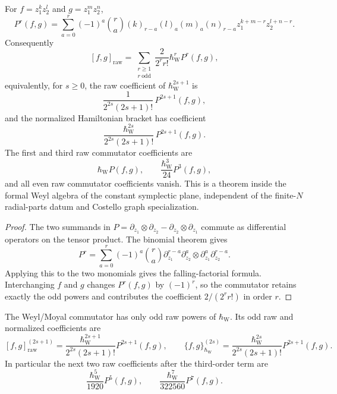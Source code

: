 \begin{thm}
\label{thm:app-radial-moyal-coefficients}
  For \(f=z_1^kz_2^l\) and \(g=z_1^mz_2^n\),
  \[
    P^r(f,g)=
    \sum_{a=0}^r(-1)^a\binom ra
      (k)_{r-a}(l)_a(m)_a(n)_{r-a}
      z_1^{k+m-r}z_2^{l+n-r}.
  \]
  Consequently
  \[
    [f,g]_{\mathrm{raw}}
      =\sum_{\substack{r\geq1\\r\ \mathrm{odd}}}
        \frac{2}{2^r r!}\hbar_{\mathrm{W}}^rP^r(f,g),
  \]
  equivalently, for \(s\geq0\), the raw coefficient of
  \(\hbar_{\mathrm{W}}^{2s+1}\) is
  \[
    \frac{1}{2^{2s}(2s+1)!}\,P^{2s+1}(f,g),
  \]
  and the normalized Hamiltonian bracket has coefficient
  \[
    \frac{\hbar_{\mathrm{W}}^{2s}}{2^{2s}(2s+1)!}\,P^{2s+1}(f,g).
  \]
  The first and third raw commutator coefficients are
  \[
    \hbar_{\mathrm{W}} P(f,g),\qquad \frac{\hbar_{\mathrm{W}}^3}{24}P^3(f,g),
  \]
  and all even raw commutator coefficients vanish.  This is a theorem
  inside the formal Weyl algebra of the constant symplectic plane,
	independent of the finite-\(N\) radial-parts datum and Costello graph
  specialization.
\end{thm}

\begin{proof}
  The two summands in
  \(P=\partial_{z_1}\otimes\partial_{z_2}
     -\partial_{z_2}\otimes\partial_{z_1}\)
  commute as differential operators on the tensor product.  The
  binomial theorem gives
  \[
    P^r=\sum_{a=0}^r(-1)^a\binom ra
      \partial_{z_1}^{r-a}\partial_{z_2}^{a}
      \otimes
      \partial_{z_1}^{a}\partial_{z_2}^{r-a}.
  \]
  Applying this to the two monomials gives the falling-factorial
  formula.  Interchanging \(f\) and \(g\) changes \(P^r(f,g)\) by
  \((-1)^r\), so the commutator retains exactly the odd powers and
  contributes the coefficient \(2/(2^r r!)\) in order \(r\).
\end{proof}

\begin{cor}
\label{cor:app-radial-all-odd-moyal-coefficients}
  The Weyl/Moyal commutator has only odd raw powers of \(\hbar_{\mathrm{W}}\).  Its
  odd raw and normalized coefficients are
  \[
    [f,g]_{\mathrm{raw}}^{(2s+1)}
      =
      \frac{\hbar_{\mathrm{W}}^{2s+1}}{2^{2s}(2s+1)!}P^{2s+1}(f,g),
    \qquad
    \{f,g\}_{\hbar_{\mathrm{W}}}^{(2s)}
      =
      \frac{\hbar_{\mathrm{W}}^{2s}}{2^{2s}(2s+1)!}P^{2s+1}(f,g).
  \]
  In particular the next two raw coefficients after the third-order
  term are
  \[
    \frac{\hbar_{\mathrm{W}}^5}{1920}P^5(f,g),\qquad
    \frac{\hbar_{\mathrm{W}}^7}{322560}P^7(f,g).
  \]
\end{cor}

